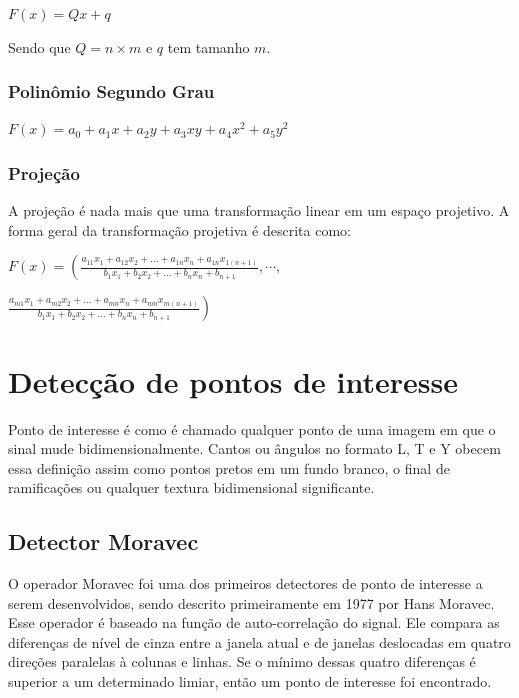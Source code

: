 \documentclass[9pt, a4paper, nofonttune, journal]{IEEEtran}
\begin{document}
\begin{center}
$F(x)=Qx+q$\end{center}
Sendo que $Q=n\times m$ e $q$ tem tamanho $m$. \cite{CGPPBook1}


\subsubsection{Polinômio Segundo Grau}

$F(x)=a_{0}+a_{1}x+a_{2}y+a_{3}xy+a_{4}x^{2}+a_{5}y^{2}$


\subsubsection{Projeção}
A projeção é nada mais que uma transformação linear em um espaço projetivo.\cite{CGPPBook1}
A forma geral da transformação projetiva é descrita como:

$F(x)=\left( \frac{a_{11}x_{1}+a_{12}x_{2}+...+a_{1n}x_{n}+a_{1n}x_{1(n+1)}}{b_{1}x_{1}+b_{2}x_{2}+...+b_{n}x_{n}+b_{n+1}},\cdots,\right.$

\begin{center}
$\left. \frac{a_{m1}x_{1}+a_{m2}x_{2}+...+a_{mn}x_{n}+a_{mn}x_{m(n+1)}}{b_{1}x_{1}+b_{2}x_{2}+...+b_{n}x_{n}+b_{n+1}} \right)$\end{center}



\section{Detecção de pontos de interesse}
\PARstart Ponto de interesse é como é chamado qualquer ponto de uma imagem em que o sinal mude bidimensionalmente. Cantos ou ângulos
no formato L, T e Y obecem essa definição assim como pontos pretos em um fundo branco, o final de ramificações ou qualquer textura bidimensional
significante.\cite{Coderlia1}


\subsection{Detector Moravec}
O operador Moravec foi uma dos primeiros detectores de ponto de interesse a serem desenvolvidos, sendo descrito primeiramente 
em 1977 por Hans Moravec.\cite{Moravec1}
Esse operador é baseado na função de auto-correlação do signal. Ele compara as diferenças de nível de cinza entre a janela atual e de janelas 
deslocadas em quatro direções paralelas à colunas e linhas. Se o mínimo dessas quatro diferenças é superior a um determinado limiar, então um ponto de interesse
foi encontrado.\cite{Coderlia1}
  
\end{document}
